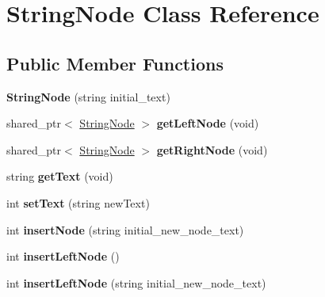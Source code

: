 \hypertarget{classStringNode}{}\section{String\+Node Class Reference}
\label{classStringNode}
\subsection*{Public Member Functions}
\begin{DoxyCompactItemize}
\item 
{\bfseries String\+Node} (string initial\+\_\+text)\hypertarget{classStringNode_a1f3433ce567eebdbb4e6eca97c473893}{}\label{classStringNode_a1f3433ce567eebdbb4e6eca97c473893}

\item 
shared\+\_\+ptr$<$ \hyperlink{classStringNode}{String\+Node} $>$ {\bfseries get\+Left\+Node} (void)\hypertarget{classStringNode_a26959d3dfb7ca6cbad4826dfe27f24f6}{}\label{classStringNode_a26959d3dfb7ca6cbad4826dfe27f24f6}

\item 
shared\+\_\+ptr$<$ \hyperlink{classStringNode}{String\+Node} $>$ {\bfseries get\+Right\+Node} (void)\hypertarget{classStringNode_a3803fff2b8a3ca379fbfc1535d882fbd}{}\label{classStringNode_a3803fff2b8a3ca379fbfc1535d882fbd}

\item 
string {\bfseries get\+Text} (void)\hypertarget{classStringNode_a43dce00f3299da71994d88ac0d3c48ee}{}\label{classStringNode_a43dce00f3299da71994d88ac0d3c48ee}

\item 
int {\bfseries set\+Text} (string new\+Text)\hypertarget{classStringNode_aa87f867d5e9ba8f8263afe8b32cd1df8}{}\label{classStringNode_aa87f867d5e9ba8f8263afe8b32cd1df8}

\item 
int {\bfseries insert\+Node} (string initial\+\_\+new\+\_\+node\+\_\+text)\hypertarget{classStringNode_a0496eef4a3ff3c8134ba1ce2e1f01804}{}\label{classStringNode_a0496eef4a3ff3c8134ba1ce2e1f01804}

\item 
int {\bfseries insert\+Left\+Node} ()\hypertarget{classStringNode_af5174c826e1d5ccd0536564431eb4561}{}\label{classStringNode_af5174c826e1d5ccd0536564431eb4561}

\item 
int {\bfseries insert\+Left\+Node} (string initial\+\_\+new\+\_\+node\+\_\+text)\hypertarget{classStringNode_a4199a842393aa4d98c3695858b097128}{}\label{classStringNode_a4199a842393aa4d98c3695858b097128}


\end{DoxyCompactItemize}
